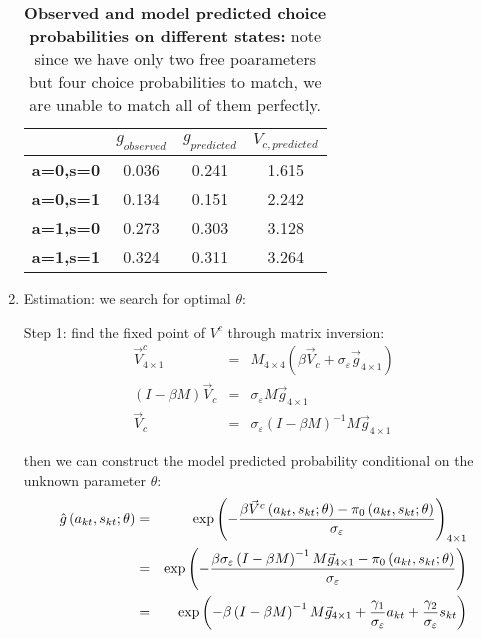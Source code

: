 \documentclass{article}
\begin{document}
\begin{enumerate}
\begin{table}[htbp]
	\centering
	\caption{\textbf{Observed and model predicted choice probabilities on different states:} note since we have only two free poarameters but four choice probabilities to match, we are unable to match all of them perfectly.}
\begin{tabular}{lccc}
	\toprule
	& \boldmath{}\textbf{$g_{observed}$}\unboldmath{} & \boldmath{}\textbf{$g_{predicted}$}\unboldmath{} & \boldmath{}\textbf{$V_{c,predicted}$}\unboldmath{} \\
	\midrule
	\textbf{a=0,s=0} & 0.036 & 0.241 & 1.615 \\
	\textbf{a=0,s=1} & 0.134 & 0.151 & 2.242 \\
	\textbf{a=1,s=0} & 0.273 & 0.303 & 3.128 \\
	\textbf{a=1,s=1} & 0.324 & 0.311 & 3.264 \\
	\bottomrule
\end{tabular}%

	\label{tab:addlabel4}%
\end{table}%



\item Estimation: we search for optimal $\theta :$

Step 1: find the fixed point of $V^{c}$ through matrix inversion:%
\begin{eqnarray*}
\vec{V}_{4\times 1}^{c} &=&M_{4\times 4}\left( \beta \vec{V}_{c}+\sigma
_{\varepsilon }\vec{g}_{4\times 1}\right) \\
\left( I-\beta M\right) \vec{V}_{c} &=&\sigma _{\varepsilon }M\vec{g}%
_{4\times 1} \\
\vec{V}_{c} &=&\sigma _{\varepsilon }\left( I-\beta M\right) ^{-1}M\vec{g}%
_{4\times 1}
\end{eqnarray*}

then we can construct the model predicted probability conditional on the
unknown parameter $\theta :$%
\begin{eqnarray*}
\hat{g}\left( a_{kt},s_{kt};\theta \right) &=&\exp \left( -\frac{\beta \vec{V%
}^{c}\left( a_{kt},s_{kt};\theta \right) -\pi _{0}\left(
a_{kt},s_{kt};\theta \right) }{\sigma _{\varepsilon }}\right) _{4\times 1} \\
&=&\exp \left( -\frac{\beta \sigma _{\varepsilon }\left( I-\beta M\right)
^{-1}M\vec{g}_{4\times 1}-\pi _{0}\left( a_{kt},s_{kt};\theta \right) }{%
\sigma _{\varepsilon }}\right) \\
&=&\exp \left( -\beta \left( I-\beta M\right) ^{-1}M\vec{g}_{4\times 1}+%
\frac{\gamma _{1}}{\sigma _{\varepsilon }}a_{kt}+\frac{\gamma _{2}}{\sigma
_{\varepsilon }}s_{kt}\right)
\end{eqnarray*}


\end{enumerate}
\end{document}

